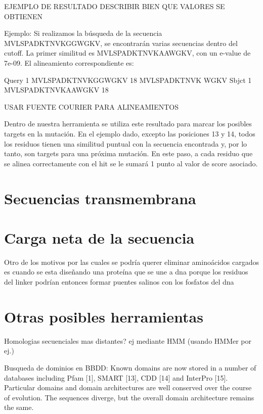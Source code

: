 EJEMPLO DE RESULTADO
DESCRIBIR BIEN QUE VALORES SE OBTIENEN

Ejemplo:
Si realizamos la búsqueda de la secuencia MVLSPADKTNVKGGWGKV, se encontrarán varias secuencias dentro del cutoff. La primer similitud es MVLSPADKTNVKAAWGKV, con un e-value de 7e-09. El alineamiento correspondiente es:

Query  1   MVLSPADKTNVKGGWGKV  18
           MVLSPADKTNVK  WGKV
Sbjct  1   MVLSPADKTNVKAAWGKV  18

USAR FUENTE COURIER PARA ALINEAMIENTOS

Dentro de nuestra herramienta se utiliza este resultado para marcar los posibles targets en la mutación. En el ejemplo dado, excepto las posiciones 13 y 14, todos los residuos tienen una similitud puntual con la secuencia encontrada y, por lo tanto, son targets para una próxima mutación.
En este paso, a cada residuo que se alinea correctamente con el hit se le sumará 1 punto al valor de score asociado.





\section{Secuencias transmembrana}
\cite{sonnhammer1998hidden}
\cite{krogh2001predicting}


\section{Carga neta de la secuencia}

Otro de los motivos por las cuales se podría querer eliminar aminoácidos cargados es cuando se esta diseñando una proteína que se une a dna porque los residuos del linker podrían 
entonces formar puentes salinos con los fosfatos del dna



\section{Otras posibles herramientas}
Homologias secuenciales mas distantes? ej mediante HMM (usando HMMer por ej.)

Busqueda de dominios en BBDD: Known domains are now stored in a number of databases including Pfam [1], SMART [13], CDD [14] and InterPro [15]. %
Particular domains and domain architectures are well conserved over the course of evolution. The sequences diverge, but the overall domain architecture remains the same.



